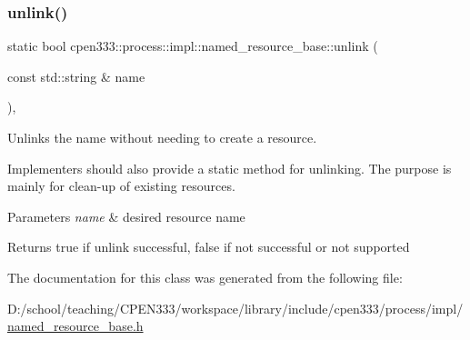 \subsubsection{\texorpdfstring{unlink()}{unlink()}\hspace{0.1cm}{\footnotesize\ttfamily [2/2]}}
{\footnotesize\ttfamily static bool cpen333\+::process\+::impl\+::named\+\_\+resource\+\_\+base\+::unlink (\begin{DoxyParamCaption}\item[{const std\+::string \&}]{name }\end{DoxyParamCaption})\hspace{0.3cm}{\ttfamily [inline]}, {\ttfamily [static]}}



Unlinks the name without needing to create a resource. 

Implementers should also provide a static method for unlinking. The purpose is mainly for clean-\/up of existing resources.


\begin{DoxyParams}{Parameters}
{\em name} & desired resource name \\
\hline
\end{DoxyParams}
\begin{DoxyReturn}{Returns}
{\ttfamily true} if unlink successful, {\ttfamily false} if not successful or not supported 
\end{DoxyReturn}


The documentation for this class was generated from the following file\+:\begin{DoxyCompactItemize}
\item 
D\+:/school/teaching/\+C\+P\+E\+N333/workspace/library/include/cpen333/process/impl/\hyperlink{named__resource__base_8h}{named\+\_\+resource\+\_\+base.\+h}\end{DoxyCompactItemize}
